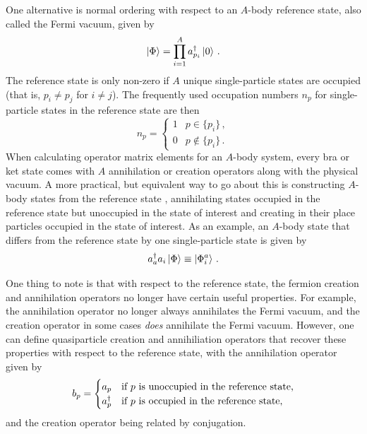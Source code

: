One alternative is normal ordering with respect to an $A$-body reference state,
also called the Fermi vacuum,
given by
\begin{equation}\label{eq:ref_state_defintion}
  \ket{\Phi} = \prod_{i=1}^A a_{p_i}^{\dagger} \ket{0}\,.
\end{equation}
The reference state is only non-zero if $A$ unique single-particle states are occupied
(that is, $p_i \neq p_j$ for $i \neq j$).
The frequently used occupation numbers $n_p$ for single-particle states in the reference state
are then
\begin{equation}
  n_p =
  \begin{cases}
    1 & p \in \{p_i\}\,,     \\
    0 & p \not\in \{p_i\}\,.
  \end{cases}
\end{equation}
When calculating operator matrix elements for an $A$-body system,
every bra or ket state comes with $A$ annihilation or creation operators
along with the physical vacuum.
A more practical, but equivalent way to go about this is constructing
$A$-body states from the reference state ,
annihilating states occupied in the reference state but unoccupied in the state of interest
and creating in their place particles occupied in the state of interest.
As an example, an $A$-body state that differs from the reference state
by one single-particle state is given by
\begin{equation}
  a_{a}^{\dagger} a_{i} \ket{\Phi} \equiv \ket{\Phi_{i}^{a}}\,.
\end{equation}

One thing to note is that with respect to the reference state,
the fermion creation and annihilation operators no longer have certain useful properties.
For example, the annihilation operator no longer always annihilates the Fermi vacuum,
and the creation operator in some cases \textit{does} annihilate the Fermi vacuum.
However, one can define quasiparticle creation and annihiliation operators
that recover these properties with respect to the reference state,
with the annihilation operator given by
\begin{equation}
  b_{p} =
  \begin{cases}
    a_{p} & \text{if $p$ is unoccupied in the reference state,} \\
    a_{p}^{\dagger}  & \text{if $p$ is occupied in the reference state,}
  \end{cases}
\end{equation}
and the creation operator being related by conjugation.

